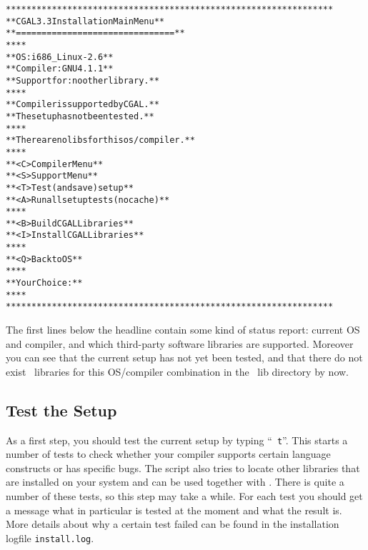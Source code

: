 {\ccTexHtml{\scriptsize}{} \label{pic:main-menu}
\begin{alltt}
  ****************************************************************
  **             CGAL 3.3 Installation Main Menu                **
  **             ===============================                **
  **                                                            **
  **   OS:          i686_Linux-2.6                              **
  **   Compiler:    GNU 4.1.1                                   **
  **   Support for: no other library.                           **
  **                                                            **
  **   Compiler is supported by CGAL.                           **
  **   The setup has not been tested.                           **
  **                                                            **
  **   There are no libs for this os/compiler.                  **
  **                                                            **
  **   <C>  Compiler Menu                                       **
  **   <S>  Support Menu                                        **
  **   <T>  Test (and save) setup                               **
  **   <A>  Run all setup tests (no cache)                      **
  **                                                            **
  **   <B>  Build CGAL Libraries                                **
  **   <I>  Install CGAL Libraries                              **
  **                                                            **
  **   <Q>  Back to OS                                          **
  **                                                            **
  **   Your Choice:                                             **
  **                                                            **
  ****************************************************************
\end{alltt}}

The first lines below the headline contain some kind of status report:
current OS and compiler, and which third-party software libraries are
supported. Moreover you can see that the current setup has not yet
been tested, and that there do not exist \cgal\ libraries for this
OS/compiler combination in the \cgal\ lib directory by now.

\subsection{Test the Setup\label{sec:test-the-setup}}

As a first step, you should test the current setup by typing ``{\tt
  t}''. This starts a number of tests to check whether your compiler
supports certain language constructs or has specific bugs.  The script
also tries to locate other libraries that are installed on your system
and can be used together with \cgal. There is quite a number of these
tests, so this step may take a while.  For each test you should get a
message what in particular is tested at the moment and what the result
is. More details about why a certain test failed can be found in the
installation logfile \texttt{install.log}.

